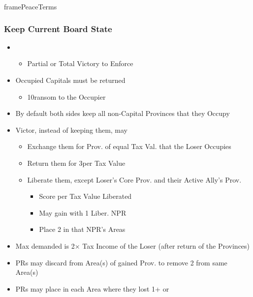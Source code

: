 \documentclass[10pt]{article}
\begin{document}
\begin{dynamiccontents*}{framePeaceTerms}
\begin{multicols}{3}
		\subsubsection*{Keep Current Board State}
		\begin{itemize}
			\item {}
			\begin{itemize}
				\item Partial or Total Victory to Enforce
			\end{itemize}
			\item Occupied Capitals must be returned
			\begin{itemize}
				\item 10\ducats ransom to the Occupier
			\end{itemize}
			\item By default both sides keep all non-Capital Provinces that they Occupy
			\item Victor, instead of keeping them, may
			\begin{itemize}
				\item Exchange them for Prov. of equal Tax Val. that the Loser Occupies
				\item Return them for 3\ducats per Tax Value
				\item Liberate them, except Loser's Core Prov. and their Active Ally's Prov.
				\begin{itemize}
					\item Score  per Tax Value Liberated
					\item May gain \alliance with 1 Liber. NPR
					\item Place 2 \influence in that NPR's Areas
				\end{itemize}
			\end{itemize}
			\item Max \ducats demanded is 2× Tax Income of the Loser (after return of the Provinces)
			\item PRs may discard \claim from Area(s) of gained Prov. to remove 2 \unrest from same Area(s)
			\item PRs may place \claim in each Area where they lost 1+ \town or \vassal
		\end{itemize}


\end{multicols}
\end{dynamiccontents*}
\end{document}
